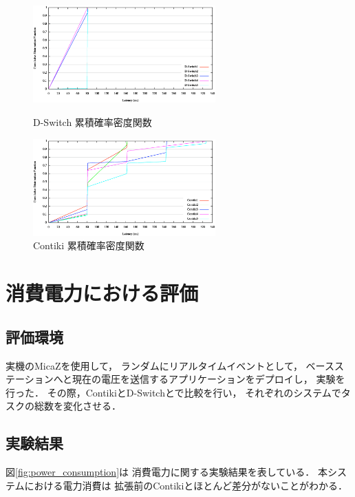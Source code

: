 \begin{figure}[htbp]
 \begin{minipage}{0.5\hsize} \begin{center}
     \includegraphics[width=70mm]{./images/cdf_d-switch.eps}
    \end{center}
    \caption{D-Switch 累積確率密度関数}
    \label{fig:cdf_d-switch}
 \end{minipage}
 \begin{minipage}{0.5\hsize}
    \begin{center}
     \includegraphics[width=70mm]{./images/cdf_contiki.eps}
    \end{center}
    \caption{Contiki 累積確率密度関数}
    \label{fig:cdf_contiki}
 \end{minipage}
\end{figure}




\section{消費電力における評価}

\subsection{評価環境}
実機のMicaZを使用して，
ランダムにリアルタイムイベントとして，
ベースステーションへと現在の電圧を送信するアプリケーションをデプロイし，
実験を行った．
その際，ContikiとD-Switchとで比較を行い，
それぞれのシステムでタスクの総数を変化させる．


\subsection{実験結果}\label{sec:result_consumption}
図\ref{fig:power_consumption}は
消費電力に関する実験結果を表している．
本システムにおける電力消費は
拡張前のContikiとほとんど差分がないことがわかる．



